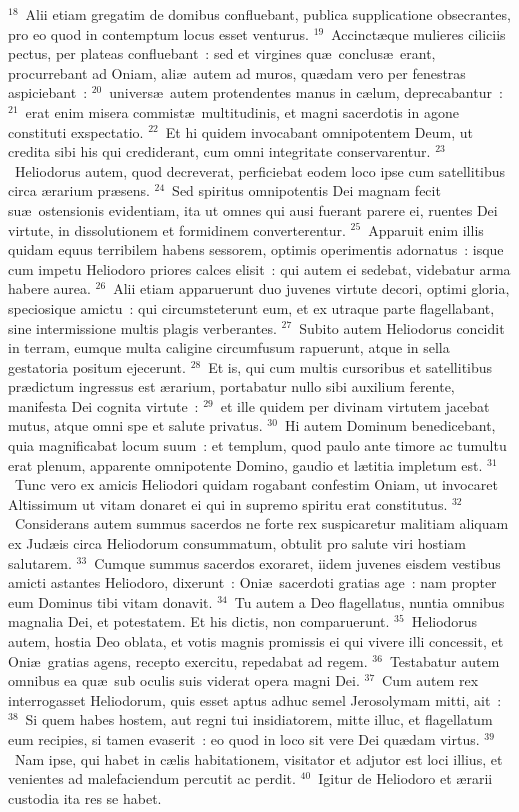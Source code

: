 ${}^{18}$~Alii etiam gregatim de domibus confluebant, publica supplicatione obsecrantes, pro eo quod in contemptum locus esset venturus.
${}^{19}$~Accinct\ae que mulieres ciliciis pectus, per plateas confluebant~: sed et virgines qu\ae\ conclus\ae\ erant, procurrebant ad Oniam, ali\ae\ autem ad muros, qu\ae dam vero per fenestras aspiciebant~:
${}^{20}$~univers\ae\ autem protendentes manus in c\ae lum, deprecabantur~:
${}^{21}$~erat enim misera commist\ae\ multitudinis, et magni sacerdotis in agone constituti exspectatio.
${}^{22}$~Et hi quidem invocabant omnipotentem Deum, ut credita sibi his qui crediderant, cum omni integritate conservarentur.
${}^{23}$~Heliodorus autem, quod decreverat, perficiebat eodem loco ipse cum satellitibus circa \ae rarium pr\ae sens.
${}^{24}$~Sed spiritus omnipotentis Dei magnam fecit su\ae\ ostensionis evidentiam, ita ut omnes qui ausi fuerant parere ei, ruentes Dei virtute, in dissolutionem et formidinem converterentur.
${}^{25}$~Apparuit enim illis quidam equus terribilem habens sessorem, optimis operimentis adornatus~: isque cum impetu Heliodoro priores calces elisit~: qui autem ei sedebat, videbatur arma habere aurea.
${}^{26}$~Alii etiam apparuerunt duo juvenes virtute decori, optimi gloria, speciosique amictu~: qui circumsteterunt eum, et ex utraque parte flagellabant, sine intermissione multis plagis verberantes.
${}^{27}$~Subito autem Heliodorus concidit in terram, eumque multa caligine circumfusum rapuerunt, atque in sella gestatoria positum ejecerunt.
${}^{28}$~Et is, qui cum multis cursoribus et satellitibus pr\ae dictum ingressus est \ae rarium, portabatur nullo sibi auxilium ferente, manifesta Dei cognita virtute~:
${}^{29}$~et ille quidem per divinam virtutem jacebat mutus, atque omni spe et salute privatus.
${}^{30}$~Hi autem Dominum benedicebant, quia magnificabat locum suum~: et templum, quod paulo ante timore ac tumultu erat plenum, apparente omnipotente Domino, gaudio et l\ae titia impletum est.
${}^{31}$~Tunc vero ex amicis Heliodori quidam rogabant confestim Oniam, ut invocaret Altissimum ut vitam donaret ei qui in supremo spiritu erat constitutus.
${}^{32}$~Considerans autem summus sacerdos ne forte rex suspicaretur malitiam aliquam ex Jud\ae is circa Heliodorum consummatum, obtulit pro salute viri hostiam salutarem.
${}^{33}$~Cumque summus sacerdos exoraret, iidem juvenes eisdem vestibus amicti astantes Heliodoro, dixerunt~: Oni\ae\ sacerdoti gratias age~: nam propter eum Dominus tibi vitam donavit.
${}^{34}$~Tu autem a Deo flagellatus, nuntia omnibus magnalia Dei, et potestatem. Et his dictis, non comparuerunt.
${}^{35}$~Heliodorus autem, hostia Deo oblata, et votis magnis promissis ei qui vivere illi concessit, et Oni\ae\ gratias agens, recepto exercitu, repedabat ad regem.
${}^{36}$~Testabatur autem omnibus ea qu\ae\ sub oculis suis viderat opera magni Dei.
${}^{37}$~Cum autem rex interrogasset Heliodorum, quis esset aptus adhuc semel Jerosolymam mitti, ait~:
${}^{38}$~Si quem habes hostem, aut regni tui insidiatorem, mitte illuc, et flagellatum eum recipies, si tamen evaserit~: eo quod in loco sit vere Dei qu\ae dam virtus.
${}^{39}$~Nam ipse, qui habet in c\ae lis habitationem, visitator et adjutor est loci illius, et venientes ad malefaciendum percutit ac perdit.
${}^{40}$~Igitur de Heliodoro et \ae rarii custodia ita res se habet.

